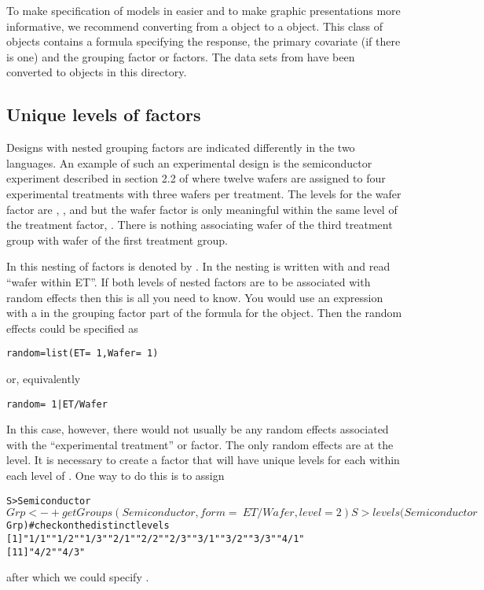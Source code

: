 \documentclass[]{article}
\newenvironment{Example}%
{\begin{list}{}{\setlength{\leftmargin}{.5\parindent}}%
  \item\begin{alltt}\small}%
    {\end{alltt}\end{list}}
\begin{document}
To make specification of models in  easier and to make graphic
presentations more informative, we recommend converting from a
 object to a  object.  This class of
objects contains a formula specifying the response, the primary
covariate (if there is one) and the grouping factor or factors.  The
data sets from  have been
converted to  objects in this directory.

\subsection{Unique levels of factors}
\label{sec:nested}

Designs with nested grouping factors are indicated differently in the
two languages.  An example of such an experimental design is the
semiconductor experiment described in section 2.2 of
 where twelve wafers are 
assigned to four experimental treatments with three wafers per
treatment.  The levels for the wafer factor are , , and
 but the wafer factor is only meaningful within the same level
of the treatment factor, .  There is nothing associating wafer
 of the third treatment group with wafer  of the first
treatment group.

In  this nesting of factors is denoted by .  In
\s{} the nesting is written with  and read ``wafer
within ET''.  If both levels of nested factors are to be associated
with random effects then this is all you need to know.  You would use
an expression with a  in the grouping factor part of the
formula for the  object.  Then the random effects
could be specified as
\begin{Example}
  random = list( ET = ~ 1, Wafer = ~ 1 )
\end{Example}
or, equivalently
\begin{Example}
  random = ~ 1 | ET/Wafer
\end{Example}

In this case, however, there would not usually be any random effects
associated with the ``experimental treatment'' or  factor.  The 
only random effects are at the  level.  It is necessary to
create a factor that will have unique levels for each 
within each level of .  One way to do this is to assign
\begin{Example}
S> Semiconductor$Grp <-
+  getGroups( Semiconductor, form = ~ ET / Wafer, level = 2 )
S> levels( Semiconductor$Grp )  # check on the distinct levels
 [1] "1/1" "1/2" "1/3" "2/1" "2/2" "2/3" "3/1" "3/2" "3/3" "4/1"
[11] "4/2" "4/3"
\end{Example}
after which we could specify .
\end{document}
